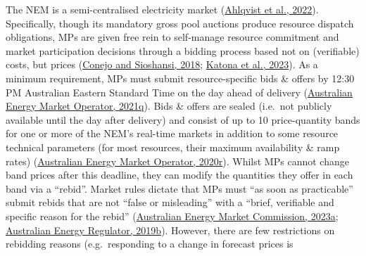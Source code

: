 \documentclass[12pt,a4paper,]{report}
\begin{document}
The NEM is a semi-centralised electricity market
(\protect\hyperlink{ref-ahlqvistSurveyComparingCentralized2022}{Ahlqvist
et al., 2022}). Specifically, though its mandatory gross pool auctions
produce resource dispatch obligations, MPs are given free rein to
self-manage resource commitment and market participation decisions
through a bidding process based not on (verifiable) costs, but prices
(\protect\hyperlink{ref-conejoRethinkingRestructuredElectricity2018}{Conejo
and Sioshansi, 2018};
\protect\hyperlink{ref-katonaPriceMechanismSurvey2023}{Katona et al.,
2023}). As a minimum requirement, MPs must submit resource-specific bids
\& offers by 12:30 PM Australian Eastern Standard Time on the day ahead
of delivery
(\protect\hyperlink{ref-australianenergymarketoperatorSpotMarketOperations2021}{Australian
Energy Market Operator, 2021q}). Bids \& offers are sealed (i.e.~not
publicly available until the day after delivery) and consist of up to 10
price-quantity bands for one or more of the NEM's real-time markets in
addition to some resource technical parameters (for most resources,
their maximum availability \& ramp rates)
(\protect\hyperlink{ref-australianenergymarketoperatorFormatValidationEnergy2020}{Australian
Energy Market Operator, 2020r}). Whilst MPs cannot change band prices
after this deadline, they can modify the quantities they offer in each
band via a ``rebid''. Market rules dictate that MPs must ``as soon as
practicable'' submit rebids that are not ``false or misleading'' with a
``brief, verifiable and specific reason for the rebid''
(\protect\hyperlink{ref-australianenergymarketcommissionNationalElectricityRules2023}{Australian
Energy Market Commission, 2023a};
\protect\hyperlink{ref-australianenergyregulatorRebiddingTechnicalParameters2019}{Australian
Energy Regulator, 2019b}). However, there are few restrictions on
rebidding reasons (e.g.~responding to a change in forecast prices is
\end{document}
